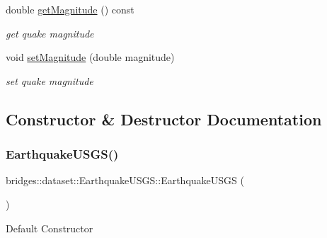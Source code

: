 \begin{DoxyCompactItemize}
double \hyperlink{classbridges_1_1dataset_1_1_earthquake_u_s_g_s_aeb1be6b0dece1240da3123db9f9c2d9b}{get\+Magnitude} () const
\begin{DoxyCompactList}\small\item\em get quake magnitude \end{DoxyCompactList}\item 
void \hyperlink{classbridges_1_1dataset_1_1_earthquake_u_s_g_s_ab961fcafd63f3ec0626ff38e2c4c01cd}{set\+Magnitude} (double magnitude)
\begin{DoxyCompactList}\small\item\em set quake magnitude \end{DoxyCompactList}\end{DoxyCompactItemize}


\subsection{Constructor \& Destructor Documentation}
\mbox{\label{classbridges_1_1dataset_1_1_earthquake_u_s_g_s_a2e89f6ef9b631c6b8315c696cee7fb53}} 
\subsubsection{\texorpdfstring{Earthquake\+U\+S\+G\+S()}{EarthquakeUSGS()}\hspace{0.1cm}{\footnotesize\ttfamily [1/3]}}
{\footnotesize\ttfamily bridges\+::dataset\+::\+Earthquake\+U\+S\+G\+S\+::\+Earthquake\+U\+S\+GS (\begin{DoxyParamCaption}{ }\end{DoxyParamCaption})\hspace{0.3cm}{\ttfamily [inline]}}

Default Constructor \mbox{\label{classbridges_1_1dataset_1_1_earthquake_u_s_g_s_a3bb03ca9f4c0a3c8ecbab5a90b1886f8}} 
